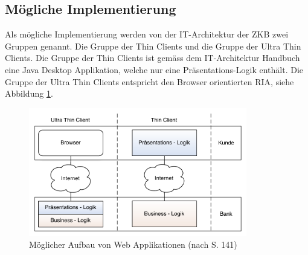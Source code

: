   \subsection{Mögliche Implementierung}
  
  Als mögliche Implementierung werden von der IT-Architektur der \ac{ZKB} zwei
  Gruppen genannt. Die Gruppe der Thin Clients und die Gruppe der Ultra Thin
  Clients. Die Gruppe der Thin Clients ist gemäss dem IT-Architektur Handbuch
  eine Java Desktop Applikation, welche nur eine Präsentations-Logik enthält.
  Die Gruppe der Ultra Thin Clients entspricht den Browser orientierten
  \ac{RIA}, siehe Abbildung \ref{img:zkbWebAnwendungen}.
  \newline
  
  \begin{figure}[hbt]
    \begin{center}
      \includegraphics[width=0.85\textwidth]{./image/zkbWebAnwendungen.pdf}
      \caption{Möglicher Aufbau von Web Applikationen (nach
      \cite{ZkbHandbuchDerItArchitektur} S. 141)}
      \label{img:zkbWebAnwendungen}
    \end{center}
  \end{figure}
  